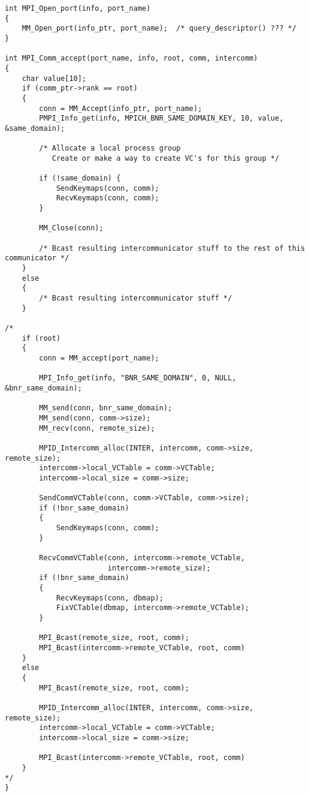 \documentclass{article}
\begin{document}
\begin{verbatim}
int MPI_Open_port(info, port_name)
{
    MM_Open_port(info_ptr, port_name);  /* query_descriptor() ??? */
}

int MPI_Comm_accept(port_name, info, root, comm, intercomm)
{
    char value[10];
    if (comm_ptr->rank == root)
    {
        conn = MM_Accept(info_ptr, port_name);
        PMPI_Info_get(info, MPICH_BNR_SAME_DOMAIN_KEY, 10, value, &same_domain);

        /* Allocate a local process group
           Create or make a way to create VC's for this group */

        if (!same_domain) {
            SendKeymaps(conn, comm);
            RecvKeymaps(conn, comm);
        }

        MM_Close(conn);

        /* Bcast resulting intercommunicator stuff to the rest of this communicator */
    }
    else
    {
        /* Bcast resulting intercommunicator stuff */
    }

/*
    if (root)
    {
        conn = MM_accept(port_name);

        MPI_Info_get(info, "BNR_SAME_DOMAIN", 0, NULL, &bnr_same_domain);

        MM_send(conn, bnr_same_domain);
        MM_send(conn, comm->size);
        MM_recv(conn, remote_size);
        
        MPID_Intercomm_alloc(INTER, intercomm, comm->size, remote_size);
        intercomm->local_VCTable = comm->VCTable;
        intercomm->local_size = comm->size;
        
        SendCommVCTable(conn, comm->VCTable, comm->size);
        if (!bnr_same_domain)
        {
            SendKeymaps(conn, comm);
        }
        
        RecvCommVCTable(conn, intercomm->remote_VCTable,
                        intercomm->remote_size);
        if (!bnr_same_domain)
        {
            RecvKeymaps(conn, dbmap);
            FixVCTable(dbmap, intercomm->remote_VCTable);
        }

        MPI_Bcast(remote_size, root, comm);
        MPI_Bcast(intercomm->remote_VCTable, root, comm)
    }
    else
    {
        MPI_Bcast(remote_size, root, comm);
        
        MPID_Intercomm_alloc(INTER, intercomm, comm->size, remote_size);
        intercomm->local_VCTable = comm->VCTable;
        intercomm->local_size = comm->size;
        
        MPI_Bcast(intercomm->remote_VCTable, root, comm)
    }
*/
}


\end{verbatim}
\end{document}
